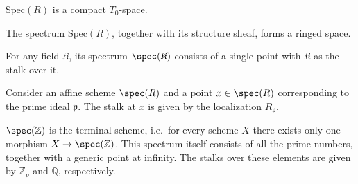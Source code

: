     \begin{property}
        $\mathrm{Spec}(R)$ is a compact $T_0$-space.
    \end{property}

    \begin{property}
        The spectrum $\mathrm{Spec}(R)$, together with its structure sheaf, forms a ringed space.
    \end{property}


    \begin{example}
        For any field $\mathfrak{K}$, its spectrum $\spec(\mathfrak{K})$ consists of a single point with $\mathfrak{K}$ as the stalk over it.
    \end{example}

    \begin{property}[Stalks]\label{scheme:stalk_affine_scheme}
        Consider an affine scheme $\spec(R)$ and a point $x\in\spec(R)$ corresponding to the prime ideal $\mathfrak{p}$. The stalk at $x$ is given by the localization $R_{\mathfrak{p}}$.
    \end{property}

    \begin{property}[Integers]
        $\spec(\mathbb{Z})$ is the terminal scheme, i.e.~for every scheme $X$ there exists only one morphism $X\rightarrow\spec(\mathbb{Z})$. This spectrum itself consists of all the prime numbers, together with a generic point at infinity. The stalks over these elements are given by $\mathbb{Z}_p$ and $\mathbb{Q}$, respectively.
    \end{property}

